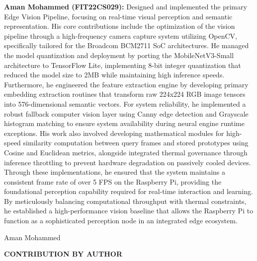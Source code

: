 \documentclass[12pt,a4paper]{report}
\begin{document}
\noindent
\textbf{Aman Mohammed (FIT22CS029):} Designed and implemented the primary Edge Vision Pipeline, focusing on real-time visual perception and semantic representation. His core contributions include the optimization of the vision pipeline through a high-frequency camera capture system utilizing OpenCV, specifically tailored for the Broadcom BCM2711 SoC architectures. He managed the model quantization and deployment by porting the MobileNetV3-Small architecture to TensorFlow Lite, implementing 8-bit integer quantization that reduced the model size to 2MB while maintaining high inference speeds. Furthermore, he engineered the feature extraction engine by developing primary embedding extraction routines that transform raw 224x224 RGB image tensors into 576-dimensional semantic vectors. For system reliability, he implemented a robust fallback computer vision layer using Canny edge detection and Grayscale histogram matching to ensure system availability during neural engine runtime exceptions. His work also involved developing mathematical modules for high-speed similarity computation between query frames and stored prototypes using Cosine and Euclidean metrics, alongside integrated thermal governance through inference throttling to prevent hardware degradation on passively cooled devices. Through these implementations, he ensured that the system maintains a consistent frame rate of over 5 FPS on the Raspberry Pi, providing the foundational perception capability required for real-time interaction and learning. By meticulously balancing computational throughput with thermal constraints, he established a high-performance vision baseline that allows the Raspberry Pi to function as a sophisticated perception node in an integrated edge ecosystem.

\vspace{3cm}
\begin{flushright}
    Aman Mohammed
\end{flushright}

\newpage
\begin{center}
    \textbf{\large CONTRIBUTION BY AUTHOR}
\end{center}
\vspace{0.5cm}
\end{document}
